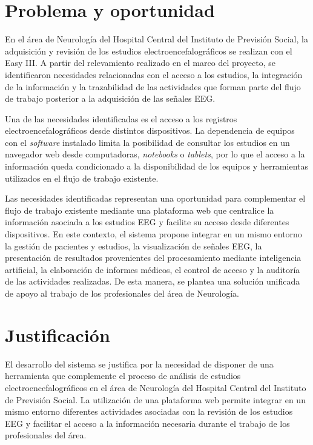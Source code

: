 \section{Problema y oportunidad}
\label{sec:problema-oportunidad}

En el área de Neurología del Hospital Central del Instituto de Previsión Social, la adquisición y revisión de los estudios electroencefalográficos se realizan con el Easy III. A partir del relevamiento realizado en el marco del proyecto, se identificaron necesidades relacionadas con el acceso a los estudios, la integración de la información y la trazabilidad de las actividades que forman parte del flujo de trabajo posterior a la adquisición de las señales EEG.

Una de las necesidades identificadas es el acceso a los registros electroencefalográficos desde distintos dispositivos. La dependencia de equipos con el \textit{software} instalado limita la
posibilidad de consultar los estudios en un navegador web desde computadoras, \textit{notebooks} o \textit{tablets}, por lo que el acceso a la información queda condicionado a la disponibilidad de los equipos y herramientas utilizados en el flujo de trabajo existente.

Las necesidades identificadas representan una oportunidad para
complementar el flujo de trabajo existente mediante una plataforma web
que centralice la información asociada a los estudios EEG y facilite
su acceso desde diferentes dispositivos. En este contexto, el sistema
propone integrar en un mismo entorno la gestión de pacientes y estudios,
la visualización de señales EEG, la presentación de resultados
provenientes del procesamiento mediante inteligencia artificial,
la elaboración de informes médicos, el control de acceso y la
auditoría de las actividades realizadas. De esta manera, se plantea
una solución unificada de apoyo al trabajo de los profesionales del
área de Neurología.

\section{Justificación}
\label{sec:justificacion}

El desarrollo del sistema se justifica por la necesidad de disponer de una
herramienta que complemente el proceso de análisis de estudios
electroencefalográficos en el área de Neurología del Hospital Central del
Instituto de Previsión Social. La utilización de una plataforma web permite integrar en un mismo
entorno diferentes actividades asociadas con la revisión de los
estudios EEG y facilitar el acceso a la información necesaria
durante el trabajo de los profesionales del área.

